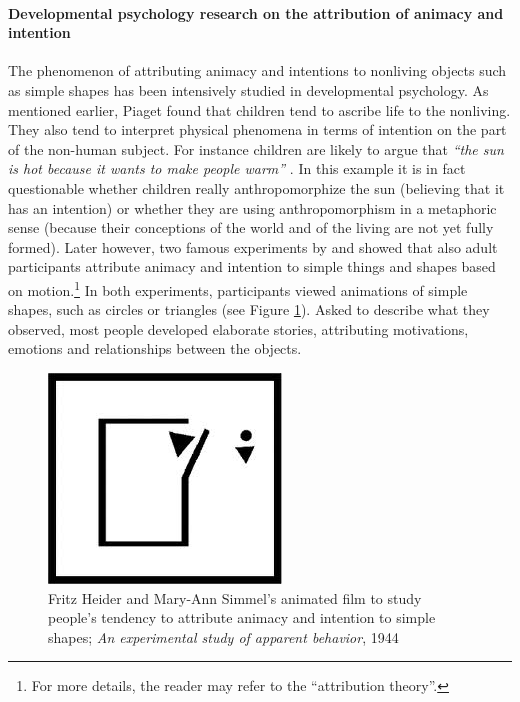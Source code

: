 \documentclass{frontiersSCNS} %
\begin{document}
\paragraph*{Developmental psychology research on the attribution of animacy and intention\\}

The phenomenon of attributing animacy and intentions to nonliving objects such as simple shapes has been intensively studied in developmental psychology. As mentioned earlier, Piaget found that children tend to ascribe life to the nonliving. They also tend to interpret physical phenomena in terms of intention on the part of the non-human subject. For instance children are likely to argue that \textit{``the sun is hot because it wants to make people warm''} \citep{leeds_childrens_1992}. In this example it is in fact questionable whether children really anthropomorphize the sun (believing that it has an intention) or whether they are using anthropomorphism in a metaphoric sense (because their conceptions of the world and of the living are not yet fully formed). Later however, two famous experiments by \cite{heider_experimental_1944} and \cite{michotte_perception_1963} showed that also adult participants attribute animacy and intention to simple things and shapes based on motion.\footnote{For more details, the reader may refer to the ``attribution theory''.} In both experiments, participants viewed animations of simple shapes, such as circles or triangles (see Figure \ref{fig:animacy_attribution}). Asked to describe what they observed, most people developed elaborate stories, attributing motivations, emotions and relationships between the objects.

\begin{figure}[h]\centering
  \includegraphics[scale=0.6]{heider-simmel_animation.jpeg}
 \caption{Fritz Heider and Mary-Ann Simmel's animated film to study people's tendency to attribute animacy and intention to simple shapes; \textit{An experimental study of apparent behavior}, 1944}
 \label{fig:animacy_attribution}       %
 \end{figure}
\end{document}
